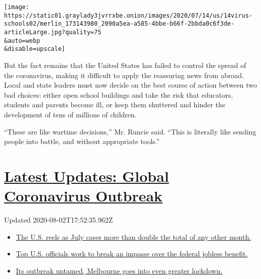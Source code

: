 \texttt{[image: https://static01.graylady3jvrrxbe.onion/images/2020/07/14/us/14virus-schools02/merlin\_173143980\_2090a5ea-a585-4bbe-b66f-2bbda0c6f3de-articleLarge.jpg?quality=75\\\&auto=webp\\\&disable=upscale]}

But the fact remains that the United States has failed to control the
spread of the coronavirus, making it difficult to apply the reassuring
news from abroad. Local and state leaders must now decide on the best
course of action between two bad choices: either open school buildings
and take the risk that educators, students and parents become ill, or
keep them shuttered and hinder the development of tens of millions of
children.

``These are like wartime decisions,'' Mr. Runcie said. ``This is
literally like sending people into battle, and without appropriate
tools.''

\hypertarget{latest-updates-global-coronavirus-outbreak}{%
\section{\texorpdfstring{\href{https://www.nytimes3xbfgragh.onion/2020/08/01/world/coronavirus-covid-19.html?action=click\&pgtype=Article\&state=default\&region=MAIN_CONTENT_1\&context=storylines_live_updates}{Latest
Updates: Global Coronavirus
Outbreak}}{Latest Updates: Global Coronavirus Outbreak}}\label{latest-updates-global-coronavirus-outbreak}}

Updated 2020-08-02T17:52:35.962Z

\begin{itemize}
\tightlist
\item
  \href{https://www.nytimes3xbfgragh.onion/2020/08/01/world/coronavirus-covid-19.html?action=click\&pgtype=Article\&state=default\&region=MAIN_CONTENT_1\&context=storylines_live_updates\#link-34047410}{The
  U.S. reels as July cases more than double the total of any other
  month.}
\item
  \href{https://www.nytimes3xbfgragh.onion/2020/08/01/world/coronavirus-covid-19.html?action=click\&pgtype=Article\&state=default\&region=MAIN_CONTENT_1\&context=storylines_live_updates\#link-780ec966}{Top
  U.S. officials work to break an impasse over the federal jobless
  benefit.}
\item
  \href{https://www.nytimes3xbfgragh.onion/2020/08/01/world/coronavirus-covid-19.html?action=click\&pgtype=Article\&state=default\&region=MAIN_CONTENT_1\&context=storylines_live_updates\#link-2bc8948}{Its
  outbreak untamed, Melbourne goes into even greater lockdown.}
\end{itemize}

